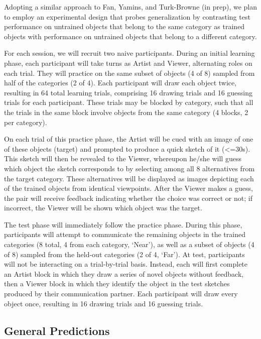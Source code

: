 \documentclass[12pt]{article}
\begin{document}
Adopting a similar approach to Fan, Yamins, and Turk-Browne (in prep), we plan to employ an experimental design that probes generalization by contrasting test performance on untrained objects that belong to the same category as trained objects with performance on untrained objects that belong to a different category. 

For each session, we will recruit two naive participants. During an initial learning phase, each participant will take turns as Artist and Viewer, alternating roles on each trial. They will practice on the same subset of objects (4 of 8) sampled from half of the categories (2 of 4). Each participant will draw each object twice, resulting in 64 total learning trials, comprising 16 drawing trials and 16 guessing trials for each participant. These trials may be blocked by category, such that all the trials in the same block involve objects from the same category (4 blocks, 2 per category). 

On each trial of this practice phase, the Artist will be cued with an image of one of these objects (target) and prompted to produce a quick sketch of it (<=30s). This sketch will then be revealed to the Viewer, whereupon he/she will guess which object the sketch corresponds to by selecting among all 8 alternatives from the target category. These alternatives will be displayed as images depicting each of the trained objects from identical viewpoints. After the Viewer makes a guess, the pair will receive feedback indicating whether the choice was correct or not; if incorrect, the Viewer will be shown which object was the target. 

The test phase will immediately follow the practice phase. During this phase, participants will attempt to communicate the remaining objects in the trained categories (8 total, 4 from each category, `Near'), as well as a subset of objects (4 of 8) sampled from the held-out categories (2 of 4, `Far'). At test, participants will not be interacting on a trial-by-trial basis. Instead, each will first complete an Artist block in which they draw a series of novel objects without feedback, then a Viewer block in which they identify the object in the test sketches produced by their communication partner. Each participant will draw every object once, resulting in 16 drawing trials and 16 guessing trials. 

\subsection{General Predictions}
\end{document}
